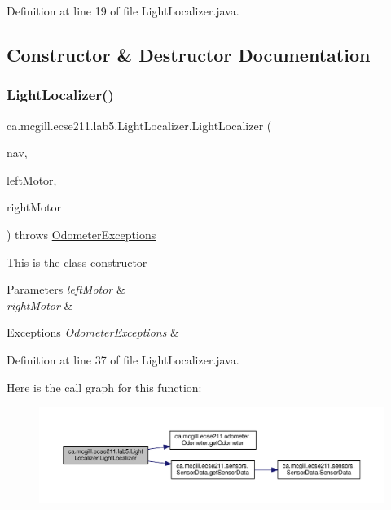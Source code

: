 Definition at line 19 of file Light\+Localizer.\+java.



\subsection{Constructor \& Destructor Documentation}
\mbox{\label{classca_1_1mcgill_1_1ecse211_1_1lab5_1_1_light_localizer_a83dbb9eaea19092e27f6f9acdd35d37a}} 
\subsubsection{\texorpdfstring{Light\+Localizer()}{LightLocalizer()}}
{\footnotesize\ttfamily ca.\+mcgill.\+ecse211.\+lab5.\+Light\+Localizer.\+Light\+Localizer (\begin{DoxyParamCaption}\item[{\hyperlink{classca_1_1mcgill_1_1ecse211_1_1lab5_1_1_navigation}{Navigation}}]{nav,  }\item[{E\+V3\+Large\+Regulated\+Motor}]{left\+Motor,  }\item[{E\+V3\+Large\+Regulated\+Motor}]{right\+Motor }\end{DoxyParamCaption}) throws \hyperlink{classca_1_1mcgill_1_1ecse211_1_1odometer_1_1_odometer_exceptions}{Odometer\+Exceptions}}

This is the class constructor


\begin{DoxyParams}{Parameters}
{\em left\+Motor} & \\
\hline
{\em right\+Motor} & \\
\hline
\end{DoxyParams}

\begin{DoxyExceptions}{Exceptions}
{\em Odometer\+Exceptions} & \\
\hline
\end{DoxyExceptions}


Definition at line 37 of file Light\+Localizer.\+java.

Here is the call graph for this function\+:\nopagebreak
\begin{figure}[H]
\begin{center}
\leavevmode
\includegraphics[width=350pt]{classca_1_1mcgill_1_1ecse211_1_1lab5_1_1_light_localizer_a83dbb9eaea19092e27f6f9acdd35d37a_cgraph}
\end{center}
\end{figure}


